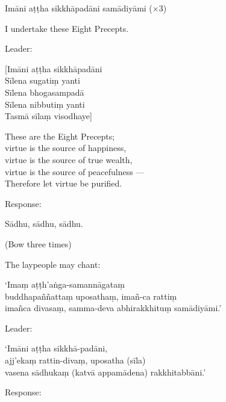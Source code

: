 Imāni aṭṭha sikkhāpadāni samādiyāmi (×3)

\begin{english}
  I undertake these Eight Precepts.
\end{english}

\begin{instruction}
  Leader:
\end{instruction}

[Imāni aṭṭha sikkhāpadāni\\
Sīlena sugatiṃ yanti\\
Sīlena bhogasampadā\\
Sīlena nibbutiṃ yanti\\
Tasmā sīlaṃ visodhaye]

\begin{english}
  These are the Eight Precepts;\\
  virtue is the source of happiness,\\
  virtue is the source of true wealth,\\
  virtue is the source of peacefulness ---\\
  Therefore let virtue be purified.
\end{english}

\begin{instruction}
  Response:
\end{instruction}

Sādhu, sādhu, sādhu.

\begin{instruction}
  (Bow three times)
\end{instruction}


\begin{instruction}
  The laypeople may chant:
\end{instruction}

‘Imaṃ aṭṭh'aṅga-samannāgataṃ\\
buddhapaññattaṃ uposathaṃ, imañ-ca rattiṃ\\
imañca divasaṃ, samma-deva abhirakkhituṃ samādiyāmi.’

\begin{instruction}
  Leader:
\end{instruction}

‘Imāni aṭṭha sikkhā-padāni,\\
ajj'ekaṃ rattin-divaṃ, uposatha (sīla)\\
vasena sādhukaṃ (katvā appamādena) rakkhitabbāni.’

\begin{instruction}
  Response:
\end{instruction}

